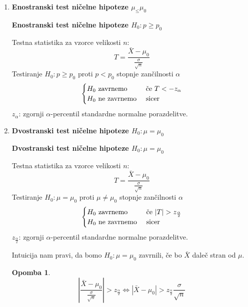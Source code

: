 \documentclass[11pt]{article}
\newtheorem{Opomba}[Izrek]{{\sc Opomba}}
\begin{document}
\begin{enumerate}
\begin{Opomba}
			$$\frac{\bar{X}- \mu_0}{\frac{\sigma}{\sqrt{n}}} > z_\alpha \iff \bar{X} > \mu_0 + z_\alpha \frac{\sigma}{\sqrt{n}}$$
		\end{Opomba}
		Izračunajmo verjetnost napake prve vrste:
		$$P(T> z_\alpha \quad | \quad \textnormal{dejanski} \quad \mu\le \mu_0) = P\left(\mathcal{N}\left(\frac{\bar{X}- \mu_0}{\frac{\sigma}{\sqrt{n}}}, 1\right) > z_\alpha | \mu\le \mu_0\right)$$
		Vzemimo, da je to funkcija parametra $\mu\le \mu_0$. Ta funkcija iam maksimum pri $\mu_0:
		P(\mathcal{N}(0,1) > z_\alpha) = \alpha$ (definicija precentila)
		\\
		\\
		Napako druge vrste naredimo, če ne zavrnemo $H_0$, čeprav drži $A$. Verjetnost je v tem primeru:
		$$P(T \le z_\alpha | \mu > \mu_0) = P\left(\mathcal{N}\left(\frac{\bar{X}- \mu_0}{\frac{\sigma}{\sqrt{n}}}, 1\right) \le z_\alpha | \mu> \mu_0\right) = F_{\mathcal{N}\left(\frac{\bar{X}- \mu_0}{\frac{\sigma}{\sqrt{n}}}, 1\right)}(z_\alpha)$$
\pagebreak
		\item 
		\textbf{Enostranski test ničelne hipoteze $\mu_ \le \mu_0$}
			\begin{framed}
			\begin{center}
				\textbf{Enostranski test ničelne hipoteze $H_0: p \ge p_0$}
			\end{center}
			Testna statistika za vzorce velikosti $n$:
			$$T = \frac{\bar{X} - \mu_0}{\frac{\sigma}{\sqrt{n}}}$$
			Testiranje $H_0: p\ge p_0$ proti $p < p_0$ stopnje zančilnosti $\alpha$
			\[
			\begin{cases}
			H_0 \textnormal{ zavrnemo } & \textnormal{če } T < -z_\alpha\\
			H_0 \textnormal{ ne zavrnemo } & \textnormal{sicer}
			\end{cases}
			\]
			$z_\alpha$: zgornji $\alpha$-percentil standardne normalne porazdelitve.
		\end{framed}
		\item
	\textbf{Dvostranski test ničelne hipoteze $H_0: \mu =\mu_0$}
	\begin{framed}
		\begin{center}
			\textbf{Dvostranski test ničelne hipoteze $H_0: \mu =\mu_0$}
		\end{center}
		Testna statistika za vzorce velikosti $n$:
		$$T = \frac{\bar{X} - \mu_0}{\frac{\sigma}{\sqrt{n}}}$$
		Testiranje $H_0: \mu = \mu_0$ proti $\mu \ne \mu_0$ stopnje zančilnosti $\alpha$
		\[
		\begin{cases}
		H_0 \textnormal{ zavrnemo } & \textnormal{če } |T| > z_{\frac{\alpha}{2}}\\
		H_0 \textnormal{ ne zavrnemo } & \textnormal{sicer}
		\end{cases}
		\]
		$z_{\frac{\alpha}{2}}$: zgornji $\alpha$-percentil standardne normalne porazdelitve.
	\end{framed}
	Intuicija nam pravi, da bomo $H_0: \mu = \mu_0$ zavrnili, če bo $\bar{X}$ daleč stran od $\mu$.
	\begin{Opomba}
	$$ \left|\frac{\bar{X}- \mu_0}{\frac{\sigma}{\sqrt{n}}} \right|> z_{\frac{\alpha}{2}} \iff | \bar{X} - \mu_0 |>  z_{\frac{\alpha}{2}} \frac{\sigma}{\sqrt{n}}$$	
	\end{Opomba}
		\end{enumerate}
\end{document}
